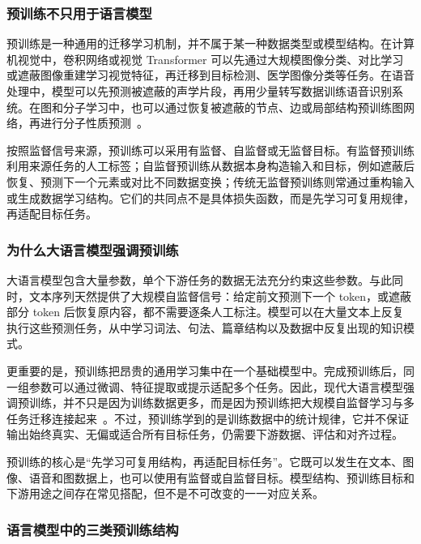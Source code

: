 \subsubsection{预训练不只用于语言模型}

预训练是一种通用的迁移学习机制，并不属于某一种数据类型或模型结构。在计算机视觉中，卷积网络或视觉 Transformer 可以先通过大规模图像分类、对比学习或遮蔽图像重建学习视觉特征，再迁移到目标检测、医学图像分类等任务。在语音处理中，模型可以先预测被遮蔽的声学片段，再用少量转写数据训练语音识别系统。在图和分子学习中，也可以通过恢复被遮蔽的节点、边或局部结构预训练图网络，再进行分子性质预测~\cite{ChenEtAl2020SimCLR,HeEtAl2022MAE,BaevskiEtAl2020Wav2vec}。

按照监督信号来源，预训练可以采用有监督、自监督或无监督目标。有监督预训练利用来源任务的人工标签；自监督预训练从数据本身构造输入和目标，例如遮蔽后恢复、预测下一个元素或对比不同数据变换；传统无监督预训练则常通过重构输入或生成数据学习结构。它们的共同点不是具体损失函数，而是先学习可复用规律，再适配目标任务。

\subsubsection{为什么大语言模型强调预训练}

大语言模型包含大量参数，单个下游任务的数据无法充分约束这些参数。与此同时，文本序列天然提供了大规模自监督信号：给定前文预测下一个 token，或遮蔽部分 token 后恢复原内容，都不需要逐条人工标注。模型可以在大量文本上反复执行这些预测任务，从中学习词法、句法、篇章结构以及数据中反复出现的知识模式。

更重要的是，预训练把昂贵的通用学习集中在一个基础模型中。完成预训练后，同一组参数可以通过微调、特征提取或提示适配多个任务。因此，现代大语言模型强调预训练，并不只是因为训练数据更多，而是因为预训练把大规模自监督学习与多任务迁移连接起来~\cite{DevlinEtAl2019BERT,RaffelEtAl2020T5,BrownEtAl2020GPT3}。不过，预训练学到的是训练数据中的统计规律，它并不保证输出始终真实、无偏或适合所有目标任务，仍需要下游数据、评估和对齐过程。

\begin{importantnote}
  预训练的核心是“先学习可复用结构，再适配目标任务”。它既可以发生在文本、图像、语音和图数据上，也可以使用有监督或自监督目标。模型结构、预训练目标和下游用途之间存在常见搭配，但不是不可改变的一一对应关系。
\end{importantnote}

\subsubsection{语言模型中的三类预训练结构}

